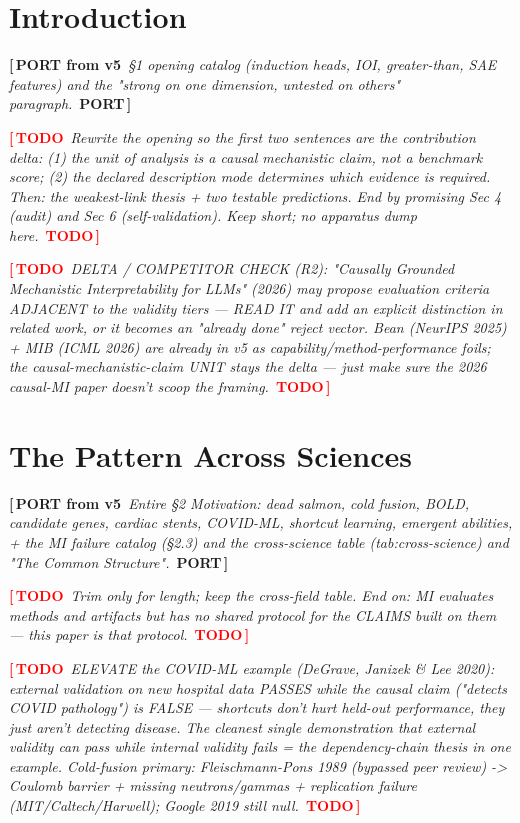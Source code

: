 \documentclass{article}
\newcommand{\TODO}[1]{\par\smallskip\noindent\textcolor{red}{\textbf{[\,TODO}}\ \textit{\textcolor{black!65}{#1}}\ \textcolor{red}{\textbf{TODO\,]}}\par\smallskip}
\newcommand{\PORT}[1]{\par\smallskip\noindent\textcolor{blue!65!black}{\textbf{[\,PORT from v5}}\ \textit{\textcolor{black!65}{#1}}\ \textcolor{blue!65!black}{\textbf{PORT\,]}}\par\smallskip}
\begin{document}
\section{Introduction}
\label{sec:intro}
\PORT{\S1 opening catalog (induction heads, IOI, greater-than, SAE features) and the
"strong on one dimension, untested on others" paragraph.}
\TODO{Rewrite the opening so the first two sentences are the contribution delta:
(1) the unit of analysis is a causal mechanistic claim, not a benchmark score;
(2) the declared description mode determines which evidence is required.
Then: the weakest-link thesis + two testable predictions. End by promising Sec 4 (audit)
and Sec 6 (self-validation). Keep short; no apparatus dump here.}
\TODO{DELTA / COMPETITOR CHECK (R2): "Causally Grounded Mechanistic Interpretability for LLMs"
(2026) may propose evaluation criteria ADJACENT to the validity tiers --- READ IT and add an
explicit distinction in related work, or it becomes an "already done" reject vector. Bean
(NeurIPS 2025) + MIB (ICML 2026) are already in v5 as capability/method-performance foils; the
causal-mechanistic-claim UNIT stays the delta --- just make sure the 2026 causal-MI paper
doesn't scoop the framing.}

\section{The Pattern Across Sciences}
\label{sec:motivation}
\PORT{Entire \S2 Motivation: dead salmon, cold fusion, BOLD, candidate genes, cardiac
stents, COVID-ML, shortcut learning, emergent abilities, + the MI failure catalog
(\S2.3) and the cross-science table (tab:cross-science) and "The Common Structure".}
\TODO{Trim only for length; keep the cross-field table. End on: MI evaluates methods and
artifacts but has no shared protocol for the CLAIMS built on them --- this paper is that protocol.}
\TODO{ELEVATE the COVID-ML example (DeGrave, Janizek \& Lee 2020): external validation on new
hospital data PASSES while the causal claim ("detects COVID pathology") is FALSE --- shortcuts
don't hurt held-out performance, they just aren't detecting disease. The cleanest single
demonstration that external validity can pass while internal validity fails = the dependency-chain
thesis in one example. Cold-fusion primary: Fleischmann-Pons 1989 (bypassed peer review) ->
Coulomb barrier + missing neutrons/gammas + replication failure (MIT/Caltech/Harwell); Google 2019
still null.}
\end{document}
